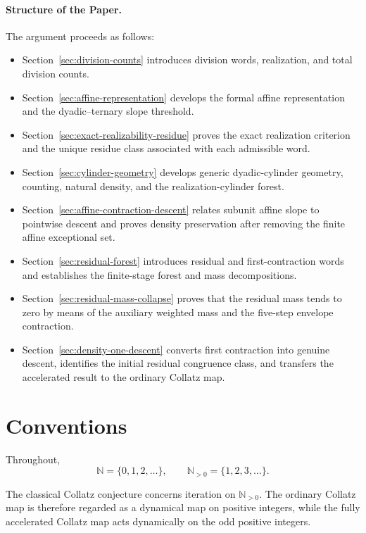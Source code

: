 \documentclass[12pt, oneside]{article}
\numberwithin{equation}{section}
\theoremstyle{definition}
\theoremstyle{plain}
\theoremstyle{remark}
\begin{document}
\paragraph{Structure of the Paper.}
The argument proceeds as follows:
\begin{itemize}
\item Section~\ref{sec:division-counts} introduces division words,
realization, and total division counts.
\item Section~\ref{sec:affine-representation} develops the formal affine
representation and the dyadic--ternary slope threshold.
\item Section~\ref{sec:exact-realizability-residue} proves the exact
realization criterion and the unique residue class associated with each
admissible word.
\item Section~\ref{sec:cylinder-geometry} develops generic dyadic-cylinder
geometry, counting, natural density, and the realization-cylinder forest.
\item Section~\ref{sec:affine-contraction-descent} relates subunit affine
slope to pointwise descent and proves density preservation after removing
the finite affine exceptional set.
\item Section~\ref{sec:residual-forest} introduces residual and
first-contraction words and establishes the finite-stage forest and mass
decompositions.
\item Section~\ref{sec:residual-mass-collapse} proves that the residual mass
tends to zero by means of the auxiliary weighted mass and the five-step
envelope contraction.
\item Section~\ref{sec:density-one-descent} converts first contraction into
genuine descent, identifies the initial residual congruence class, and
transfers the accelerated result to the ordinary Collatz map.
\end{itemize}


\section{Conventions}
\label{sec:conventions}

Throughout,
\[
\mathbb N=\{0,1,2,\ldots\},
\qquad
\mathbb N_{>0}=\{1,2,3,\ldots\}.
\]

The classical Collatz conjecture concerns iteration on
\(\mathbb N_{>0}\). The ordinary Collatz map is therefore regarded as a
dynamical map on positive integers, while the fully accelerated Collatz map
acts dynamically on the odd positive integers.
\end{document}
